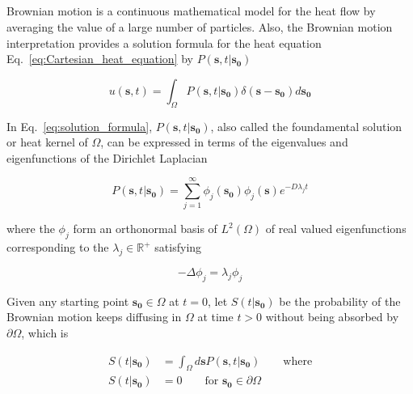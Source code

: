  
\subsection{}


Brownian motion is a continuous mathematical model for the heat flow
by averaging the value of a large number of particles. Also, the
Brownian motion interpretation provides a solution formula for the
heat equation Eq.~\ref{eq:Cartesian_heat_equation} by $P(\bm{s}, t
|\bm{s_0})$

\begin{equation}\label{eq:solution_formula}
  u(\bm{s}, t) = \int_{\Omega}  P(\bm{s}, t | \bm{s_0}) \delta(\bm{s} - \bm{s_0}) d\bm{s_0}
\end{equation}

In Eq.~\ref{eq:solution_formula}, $P(\bm{s}, t | \bm{s_0})$, also
called the foundamental solution or heat kernel of $\Omega$, can be
expressed in terms of the eigenvalues and eigenfunctions of the
Dirichlet Laplacian

\begin{equation}\label{eq:heat_kernel}
  P(\bm{s}, t | \bm{s_0}) = \sum_{j=1}^{\infty} \phi_{j}(\bm{s_0})\phi_{j}(\bm{s})e^{-D\lambda_{j}t}
\end{equation}

where the $\phi_{j}$ form an orthonormal basis of $L^2(\Omega)$ of
real valued eigenfunctions corresponding to the $\lambda_j \in \mathbb{R}^+$ satisfying

\begin{equation}\label{eq:eigenvalue_equation}
  - \Delta \phi_{j} = \lambda_{j} \phi_{j} 
\end{equation}



Given any starting point $\bm{s_0} \in \Omega$ at $t=0$, let $S(t |
\bm{s_0})$ be the probability of the Brownian motion keeps diffusing
in $\Omega$ at time $t > 0$ without being absorbed by $\partial
\Omega$, which is

\begin{align}
  S(t | \bm{s_0}) &= \int_{\Omega} d\bm{s} P(\bm{s}, t | \bm{s_0}) \qquad \text{where} \label{eq:local_survival_probability} \\
  S(t | \bm{s_0}) &= 0 \qquad \text{for $\bm{s_0} \in \partial \Omega$}
\end{align}


